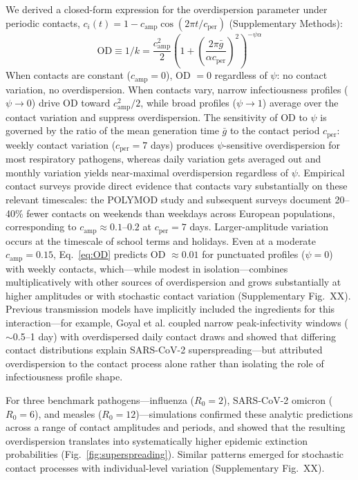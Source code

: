 We derived a closed-form expression for the overdispersion parameter under periodic contacts, $c_i(t) = 1 - c_\text{amp}\cos(2\pi t / c_\text{per})$ (Supplementary Methods):
%
\begin{equation}
	\text{OD} \equiv 1/k = \frac{c_\text{amp}^2}{2} \left(1 + \left(\frac{2\pi \bar{g}}{\alpha c_\text{per}}\right)^2\right)^{-\psi\alpha}
	\label{eq:OD}
\end{equation}
%
When contacts are constant ($c_\text{amp} = 0$), OD $= 0$ regardless of $\psi$: no contact variation, no overdispersion. When contacts vary, narrow infectiousness profiles ($\psi \to 0$) drive OD toward $c_\text{amp}^2/2$, while broad profiles ($\psi \to 1$) average over the contact variation and suppress overdispersion. The sensitivity of OD to $\psi$ is governed by the ratio of the mean generation time $\bar{g}$ to the contact period $c_\text{per}$: weekly contact variation ($c_\text{per} = 7$ days) produces $\psi$-sensitive overdispersion for most respiratory pathogens, whereas daily variation gets averaged out and monthly variation yields near-maximal overdispersion regardless of $\psi$. Empirical contact surveys provide direct evidence that contacts vary substantially on these relevant timescales: the POLYMOD study\citep{mossong_social_2008} and subsequent surveys\citep{jarvis_quantifying_2020} document 20--40\% fewer contacts on weekends than weekdays across European populations, corresponding to $c_\text{amp} \approx 0.1$--$0.2$ at $c_\text{per} = 7$ days. Larger-amplitude variation occurs at the timescale of school terms and holidays. Even at a moderate $c_\text{amp} = 0.15$, Eq.~\ref{eq:OD} predicts OD $\approx 0.01$ for punctuated profiles ($\psi = 0$) with weekly contacts, which---while modest in isolation---combines multiplicatively with other sources of overdispersion and grows substantially at higher amplitudes or with stochastic contact variation (Supplementary Fig.~XX). Previous transmission models have implicitly included the ingredients for this interaction---for example, Goyal et al.\citep{goyal_viral_2021} coupled narrow peak-infectivity windows ($\sim$0.5--1 day) with overdispersed daily contact draws and showed that differing contact distributions explain SARS-CoV-2 superspreading---but attributed overdispersion to the contact process alone rather than isolating the role of infectiousness profile shape.

For three benchmark pathogens---influenza ($R_0 = 2$), SARS-CoV-2 omicron ($R_0 = 6$), and measles ($R_0 = 12$)---simulations confirmed these analytic predictions across a range of contact amplitudes and periods, and showed that the resulting overdispersion translates into systematically higher epidemic extinction probabilities (Fig.~\ref{fig:superspreading}). Similar patterns emerged for stochastic contact processes with individual-level variation (Supplementary Fig.~XX).

